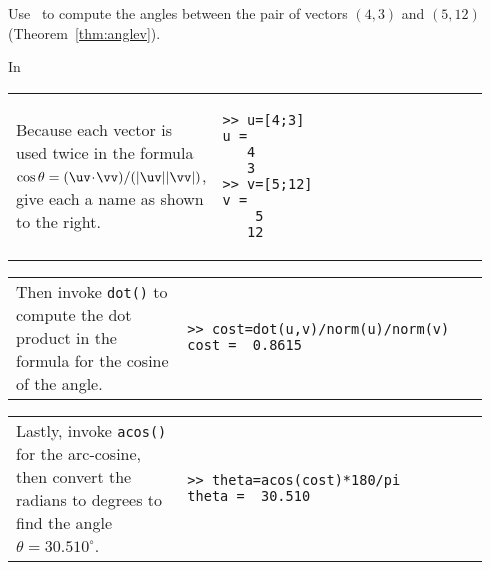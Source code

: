 \begin{example} \label{eg:}
Use \script\ to compute the angles between the pair of vectors \((4,3)\) and \((5,12)\) (Theorem~\ref{thm:anglev}).
\begin{solution} In \script

\begin{tabular}{@{}p{0.34\linewidth}p{0.6\linewidth}@{}}\raggedright
Because each vector is used twice in the formula \(\cos\theta=(\uv\cdot\vv)/(|\uv||\vv|)\), give each a name as shown to the right.
&\begin{verbatim}
>> u=[4;3]
u =
   4
   3
>> v=[5;12]
v =
    5
   12
\end{verbatim}
\end{tabular}
\setbox\ajrqrbox\hbox{}%
\marginpar{\usebox{\ajrqrbox\\[2ex]}}%

\begin{tabular}{@{}p{0.34\linewidth}p{0.6\linewidth}@{}}\raggedright
Then invoke \verb|dot()| to compute the dot product in the formula for the cosine of the angle.
&\begin{verbatim}
>> cost=dot(u,v)/norm(u)/norm(v)
cost =  0.8615
\end{verbatim}
\end{tabular}

\begin{tabular}{@{}p{0.34\linewidth}p{0.6\linewidth}@{}}\raggedright
Lastly, invoke \verb|acos()| for the arc-cosine, then convert the radians to degrees to find the angle \(\theta=30.510^\circ\).
&\begin{verbatim}
>> theta=acos(cost)*180/pi
theta =  30.510
\end{verbatim}
\end{tabular}

\end{solution}
\end{example}




